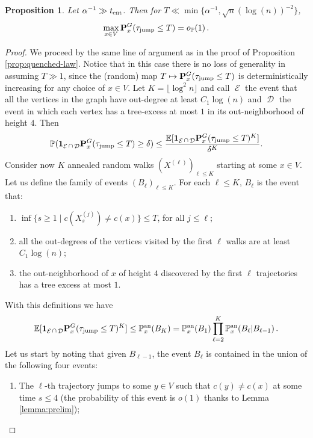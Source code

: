 \documentclass[11pt,oneside]{amsart}
\numberwithin{equation}{section}  %
\theoremstyle{plain}
\newtheorem{proposition}[theorem]{Proposition}
\DeclareMathOperator{\cD}{\mathcal{D}}
\DeclareMathOperator{\cE}{\mathcal{E}}
\newcommand{\E}{\mathbb{E}}
\newcommand{\p}{\mathbb{P}}
\newcommand{\one}{\textup{\textbf{1}}}
\newcommand{\op}{o_{\p}}
\newcommand{\tent}{t_{\textup{ent}}}
\newcommand{\quenchG}{\mathbf{P}^G}
\newcommand{\pan}{\p^{\textup{an}}}
\newcommand{\tauj}{\tau_{\textup{jump}}}
\begin{document}
\begin{proposition} \label{prop:jump-time}
Let $\alpha^{-1}\gg \tent$. Then for $T \ll \min\{\alpha^{-1}, \sqrt{n}(\log(n))^{-2}\}$,
\begin{equation}\label{eq:prop-jump-time}
    \max_{x \in V}\quenchG_x(\tauj \le  T) = \op(1)\,.
\end{equation}
\end{proposition}

\begin{proof} 
We proceed by the same line of argument as in the proof of Proposition \ref{prop:quenched-law}. Notice that in this case there is no loss of generality in assuming $T\gg 1$, since the (random) map $T\mapsto \quenchG_x(\tauj\le T)$ is deterministically increasing for any choice of $x\in V$. Let $K=\lfloor \log^2 n \rfloor$ and call $\cE$ the event that all the vertices in the graph have out-degree at least $C_1\log(n)$ and $\cD$ the event in which each vertex has a tree-excess at most $1$ in its out-neighborhood of height $4$. Then
	\begin{equation}
	\p(\one_{\cE\cap \cD}\quenchG_x(\tauj\le T)\ge \delta) \le \frac{\E[\one_{\cE\cap \cD}\quenchG_x(\tauj\le T)^K]}{\delta^K}.
	\end{equation}
%
		Consider now $K$ annealed random walks $(X^{(\ell)})_{\ell\le K}$ starting at some $x\in V$.
		Let us define the family of events $(B_{\ell})_{\ell \le K}$. For each $\ell \le K$, $B_{\ell}$ is the event that:
		\begin{enumerate}
			\item[(i)] $\inf\{s\ge 1\mid c(X^{(j)}_s)\neq c(x) \}\le T$, for all $j\le \ell$;
			\item[(ii)] all the out-degrees of the vertices visited by the first $\ell$ walks are at least $C_1\log(n)$;
			\item[(iii)] the out-neighborhood of $x$ of height $4$ discovered by the first $\ell$ trajectories has a tree excess at most $1$.
	\end{enumerate} 
%
With this definitions we have
	\begin{equation}
		\E[\one_{\cE\cap \cD}\quenchG_x(\tauj\le T)^K] \le \pan_x(B_K)=\pan_x(B_1)\prod_{{\ell}=2}^{K} \pan_x( B_{{\ell}}| B_{{\ell}-1})\,.
	\end{equation}
	Let us start by noting that
	given $B_{{\ell}-1}$, the event $B_{\ell}$ is contained in the union of the following four events:
	\begin{enumerate}
		\item[(0)] The ${\ell}$-th trajectory jumps to some $y\in V$ such that $c(y)\neq c(x)$ at some time $s\le 4$ (the probability of this event is $o(1)$ thanks to Lemma \ref{lemma:prelim});

\end{enumerate}
\end{proof}
\end{document}
